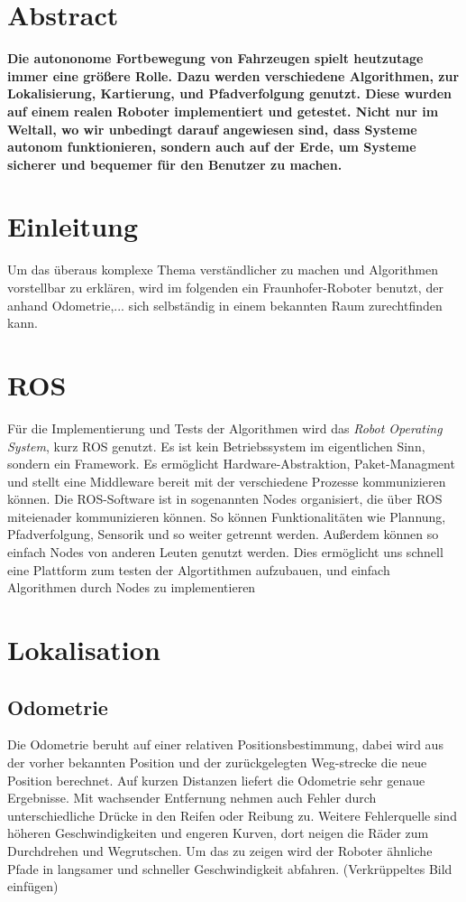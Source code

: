 \documentclass[11pt,a4paper]{article}
\begin{document}
\section*{Abstract}
{
\textbf{Die autononome Fortbewegung von Fahrzeugen spielt heutzutage immer eine gr\"o\ss{}ere Rolle. Dazu werden verschiedene Algorithmen, zur Lokalisierung, Kartierung, und Pfadverfolgung genutzt. Diese wurden auf einem realen Roboter implementiert und getestet. Nicht nur im Weltall, wo wir unbedingt darauf angewiesen sind, dass Systeme autonom funktionieren, sondern auch auf der Erde, um Systeme sicherer und bequemer f\"ur den Benutzer zu machen. }


\section{Einleitung}
Um das überaus komplexe Thema verst\"andlicher zu machen und Algorithmen vorstellbar zu erkl\"aren, wird im folgenden ein Fraunhofer-Roboter benutzt, der anhand Odometrie,... sich selbst\"andig in einem bekannten Raum zurechtfinden kann.

\section{ROS}
F\"ur die Implementierung und Tests der Algorithmen wird das \textit{Robot Operating System}, kurz ROS genutzt. Es ist kein Betriebssystem im eigentlichen Sinn, sondern ein Framework. Es erm\"oglicht Hardware-Abstraktion, Paket-Managment und stellt eine Middleware bereit mit der verschiedene Prozesse kommunizieren k\"onnen. \cite{rosWiki}
Die ROS-Software ist in sogenannten Nodes organisiert, die über ROS miteienader kommunizieren k\"onnen. So können Funktionalitäten wie Plannung, Pfadverfolgung, Sensorik und so weiter getrennt werden. Außerdem können so einfach Nodes von anderen Leuten genutzt werden. Dies ermöglicht uns schnell eine Plattform zum testen der Algortithmen aufzubauen, und einfach Algorithmen durch Nodes zu implementieren 
 

\section{Lokalisation}
\subsection{Odometrie}
{Die Odometrie beruht auf einer relativen Positionsbestimmung, dabei wird aus der vorher bekannten Position und der zur\"uckgelegten Weg-strecke die neue Position berechnet. Auf kurzen Distanzen liefert die Odometrie sehr genaue Ergebnisse. Mit wachsender Entfernung nehmen auch Fehler durch unterschiedliche Dr\"ucke in den Reifen oder Reibung zu. Weitere Fehlerquelle sind h\"oheren Geschwindigkeiten und engeren Kurven, dort neigen die R\"ader zum Durchdrehen und Wegrutschen. Um das zu zeigen wird der Roboter \"ahnliche Pfade in langsamer und schneller Geschwindigkeit abfahren. 
	(Verkrüppeltes Bild einfügen)
	
}}
\end{document}
